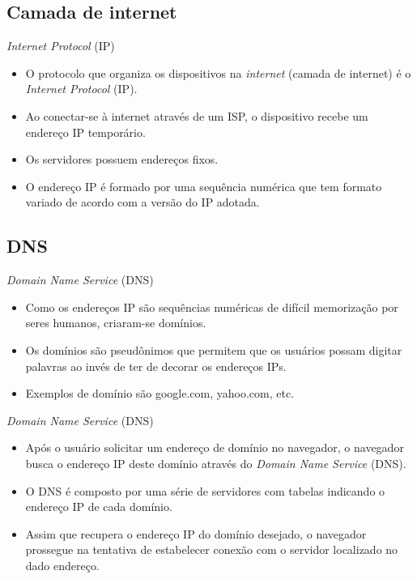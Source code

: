 \documentclass[11pt]{beamer}
\begin{document}
    \subsection{Camada de internet}

    \begin{frame}{\textit{Internet Protocol} (IP)}
      \begin{itemize}
        \item O protocolo que organiza os dispositivos na \textit{internet} (camada de internet) é o \textit{Internet Protocol} (IP).
        \item Ao conectar-se à internet através de um ISP, o dispositivo recebe um endereço IP temporário.
        \item Os servidores possuem endereços fixos. 
        \item O endereço IP é formado por uma sequência numérica que tem formato variado de acordo com a versão do IP adotada.
      \end{itemize}
    \end{frame}

    \subsection{DNS}

    \begin{frame}{\textit{Domain Name Service} (DNS)}
      \begin{itemize}
        \item Como os endereços IP são sequências numéricas de difícil memorização por seres humanos, criaram-se domínios.
        \item Os domínios são pseudônimos que permitem que os usuários possam digitar palavras ao invés de ter de decorar os endereços IPs.
        \item Exemplos de domínio são google.com, yahoo.com, etc.
      \end{itemize}
    \end{frame}

    \begin{frame}{\textit{Domain Name Service} (DNS)}
      \begin{itemize}
        \item Após o usuário solicitar um endereço de domínio no navegador, o navegador busca o endereço IP deste domínio através do \textit{Domain Name Service} (DNS).
        \item O DNS é composto por uma série de servidores com tabelas indicando o endereço IP de cada domínio.
        \item Assim que recupera o endereço IP do domínio desejado, o navegador prossegue na tentativa de estabelecer conexão com o servidor localizado no dado endereço.
      \end{itemize}
    \end{frame}
\end{document}
